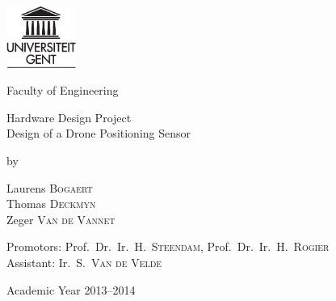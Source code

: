 

\begin{titlepage}
%

\fontsize{12pt}{14pt}
\selectfont

\begin{center}

\includegraphics[height=2cm]{ruglogo}

\vspace{0.5cm}

Faculty of Engineering

\vspace{3.5cm}

\fontsize{17.28pt}{21pt}
\selectfont

Hardware Design Project\\
Design of a Drone Positioning Sensor

\fontsize{12pt}{14pt}
\selectfont

\vspace{.6cm}

by 

\vspace{.4cm}

Laurens \textsc{Bogaert}\\
Thomas \textsc{Deckmyn}\\
Zeger \textsc{Van de Vannet}

\vspace{3.5cm}

Promotors: Prof.~Dr.~Ir.~H.~\textsc{Steendam}, 
            Prof.~Dr.~Ir.~H.~\textsc{Rogier}\\ 
Assistant: Ir.~S.~\textsc{Van de Velde}\\

\vspace{2cm}


\vspace{1cm}

Academic Year 2013--2014

\end{center}
\end{titlepage}
